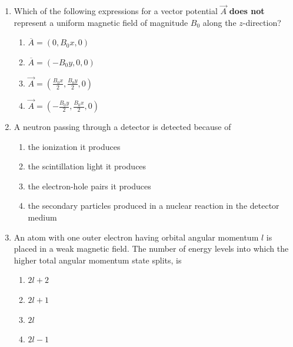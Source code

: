 \documentclass[journal,12pt,onecolumn]{IEEEtran}
\begin{document}
\begin{enumerate}
\item Which of the following expressions for a vector potential $\vec{A}$ \textbf{does not} represent a uniform magnetic field of magnitude $B_{0}$ along the $z$-direction?  

\hfill{}

\begin{multicols}{2}
\begin{enumerate}
    \item $\overline{A} = (0, B_{0}x, 0)$
    \item $\overline{A} = (-B_{0}y, 0, 0)$
    \item $\vec{A} = \left( \frac{B_{0}x}{2}, \frac{B_{0}y}{2}, 0 \right)$
    \item $\vec{A} = \left( -\frac{B_{0}y}{2}, \frac{B_{0}x}{2}, 0 \right)$
\end{enumerate}
\end{multicols}

\item A neutron passing through a detector is detected because of  

\hfill{}


\begin{enumerate}
    \item the ionization it produces
    \item the scintillation light it produces
    \item the electron-hole pairs it produces
    \item the secondary particles produced in a nuclear reaction in the detector medium
\end{enumerate}


\item An atom with one outer electron having orbital angular momentum $l$ is placed in a weak magnetic field. The number of energy levels into which the higher total angular momentum state splits, is  

\hfill{}

\begin{multicols}{2}
\begin{enumerate}
    \item $2l+2$
    \item $2l+1$
    \item $2l$
    \item $2l-1$
\end{enumerate}
\end{multicols}


\end{enumerate}
\end{document}
